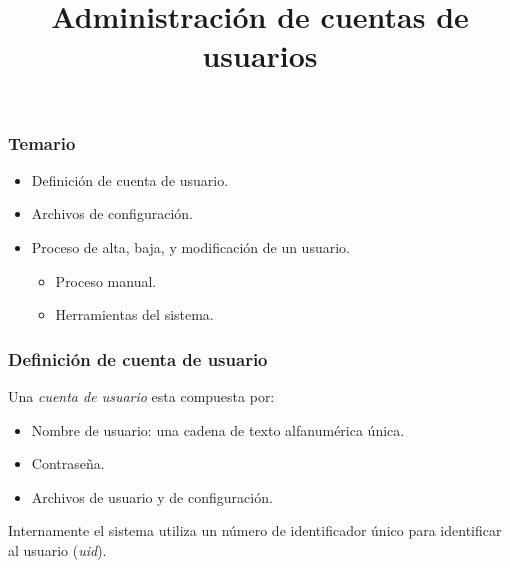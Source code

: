 \documentclass[11pt,a4paper,spanish]{beamer}
\title{\textbf{Administración de cuentas de usuarios}}
\author{}
\date{}
\begin{document}
\begin{frame}[noframenumbering]

    \maketitle

\end{frame}

\begin{frame}[label=temario]

    \frametitle{Temario}

\begin{itemize}

    \item Definición de cuenta de usuario.
    \item Archivos de configuración.
    \item Proceso de alta, baja, y modificación de un usuario.
        \begin{itemize}
            \item Proceso manual.
            \item Herramientas del sistema.
        \end{itemize}

\end{itemize}

\end{frame}

\begin{frame}

    \frametitle{Definición de cuenta de usuario}

    Una \emph{cuenta de usuario} esta compuesta por:
    \begin{itemize}
        \item Nombre de usuario: una cadena de texto alfanumérica única.
        \item Contraseña.
        \item Archivos de usuario y de configuración.
    \end{itemize}

    Internamente el sistema utiliza un número de identificador único para
    identificar al usuario (\emph{uid}).

\end{frame}
\end{document}
